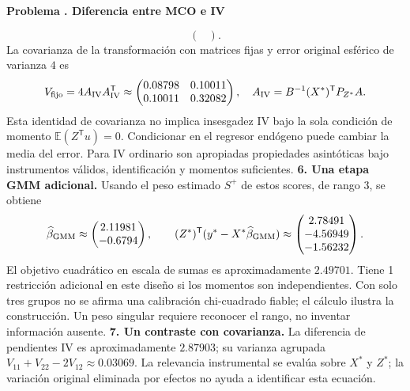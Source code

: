 \documentclass[11pt,a4paper]{article}
\newcommand{\E}{\mathbb E}
\newcommand{\T}{^{\mathsf T}}
\theoremstyle{definition}
\newcounter{problema}
\newenvironment{resuelto}[1]{\refstepcounter{problema}\par\medskip\Needspace{6\baselineskip}\textbf{Problema \theproblema. #1}\par}{\par\medskip}
\begin{document}
\begin{resuelto}{Diferencia entre MCO e IV}
\[\begin{pmatrix}
\end{pmatrix}.
\]
La covarianza de la transformación con matrices fijas y error original esférico de varianza $4$ es
\[
V_{\rm fijo}=4A_{\rm IV}A_{\rm IV}\T\approx\begin{pmatrix}
0.08798&0.10011\\0.10011&0.32082
\end{pmatrix},\quad A_{\rm IV}=B^{-1}(X^*)\T P_{Z^*}A.
\]
Esta identidad de covarianza no implica insesgadez IV bajo la sola condición de momento $\E(Z\T u)=0$. Condicionar en el regresor endógeno puede cambiar la media del error. Para IV ordinario son apropiadas propiedades asintóticas bajo instrumentos válidos, identificación y momentos suficientes.
\textbf{6. Una etapa GMM adicional.} Usando el peso estimado $S^+$ de estos scores, de rango $3$, se obtiene
\[
\widehat\beta_{\rm GMM}\approx\begin{pmatrix}
2.11981\\-0.6794
\end{pmatrix},\qquad
(Z^*)\T(y^*-X^*\widehat\beta_{\rm GMM})\approx\begin{pmatrix}
2.78491\\-4.56949\\-1.56232
\end{pmatrix}.
\]
El objetivo cuadrático en escala de sumas es aproximadamente $2.49701$. Tiene 1 restricción adicional en este diseño si los momentos son independientes. Con solo tres grupos no se afirma una calibración chi-cuadrado fiable; el cálculo ilustra la construcción. Un peso singular requiere reconocer el rango, no inventar información ausente.
\textbf{7. Un contraste con covarianza.} La diferencia de pendientes IV es aproximadamente $2.87903$; su varianza agrupada $V_{11}+V_{22}-2V_{12}\approx0.03069$. La relevancia instrumental se evalúa sobre $X^*$ y $Z^*$; la variación original eliminada por efectos no ayuda a identificar esta ecuación.
\end{resuelto}
\end{document}
